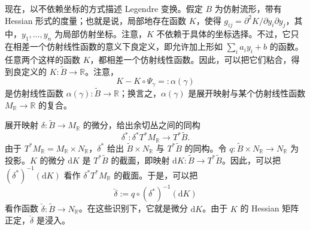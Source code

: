 现在，以不依赖坐标的方式描述 Legendre 变换。假定 $B$ 为仿射流形，带有 Hessian 形式的度量；也就是说，局部地存在函数 $K$，使得 $g_{ij}=\partial^2K/\partial y_i\partial y_j$，其中，$y_1,\ldots,y_n$ 为局部仿射坐标。注意，$K$ 不依赖于具体的坐标选择。不过，它只在相差一个仿射线性函数的意义下良定义，即允许加上形如 $\sum_i a_i y_i+b$ 的函数。任意两个这样的函数 $K$，都相差一个仿射线性函数。因此，可以把它们粘合，得到良定义的 $K\colon\widetilde B\to\mathbb R$。注意，
\[
K-K\circ\Psi_\gamma=:\alpha(\gamma)
\]
是仿射线性函数 $\alpha(\gamma)\colon\widetilde B\to\mathbb R$；换言之，$\alpha(\gamma)$ 是展开映射与某个仿射线性函数 $M_{\mathbb R}\to\mathbb R$ 的复合。

展开映射 $\delta\colon\widetilde B\to M_{\mathbb R}$ 的微分，给出余切丛之间的同构
\[
\delta^*\colon\delta^*T^*M_{\mathbb R}\longrightarrow T^*\widetilde B.
\]
由于 $T^*M_{\mathbb R}=M_{\mathbb R}\times N_{\mathbb R}$，$\delta^*$ 给出 $\widetilde B\times N_{\mathbb R}$ 与 $T^*\widetilde B$ 的同构。令 $q\colon\widetilde B\times N_{\mathbb R}\to N_{\mathbb R}$ 为投影。$K$ 的微分 $\mathrm dK$ 是 $T^*\widetilde B$ 的截面，即映射 $\mathrm dK\colon\widetilde B\to T^*\widetilde B$。因此，可以把 $(\delta^*)^{-1}(\mathrm dK)$ 看作 $\delta^*T^*M_{\mathbb R}$ 的截面。于是，可以把
\[
\check\delta:=q\circ(\delta^*)^{-1}(\mathrm dK)
\]
看作函数 $\check\delta\colon\widetilde B\to N_{\mathbb R}$。在这些识别下，它就是微分 $\mathrm dK$。由于 $K$ 的 Hessian 矩阵正定，$\check\delta$ 是浸入。

